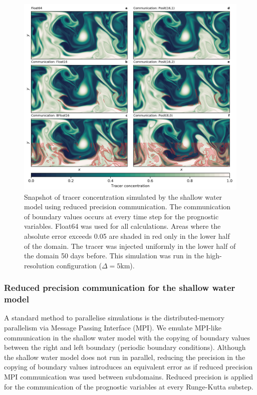 \documentclass[draft]{agujournal2019}
\begin{document}
\begin{figure}
\includegraphics[width=1\textwidth]{snapshot_comm.png}
\caption{Snapshot of tracer concentration simulated by the shallow water model
using reduced precision communication. The communication of boundary values occurs
at every time step for the prognostic variables. Float64 was used for all calculations.
Areas where the absolute error exceeds 0.05 are shaded in red only in the lower
half of the domain. The tracer was injected uniformly in the lower half of the
domain 50 days before. This simulation was run in the high-resolution
configuration ($\Delta = 5$km).}
\label{fig:snapshot_comm}
\end{figure}


\subsubsection{Reduced precision communication for the shallow water model}
\label{sec:comm}

A standard method to parallelise simulations is the distributed-memory parallelism
via Message Passing Interface (MPI). We emulate MPI-like communication in the
shallow water model with the copying of boundary values between the right and
left boundary (periodic boundary conditions). Although the shallow water model
does not run in parallel, reducing the precision in the copying of boundary values
introduces an equivalent error as if reduced precision MPI communication was used
between subdomains. Reduced precision is applied for the communication of the
prognostic variables at every Runge-Kutta substep.
\end{document}
